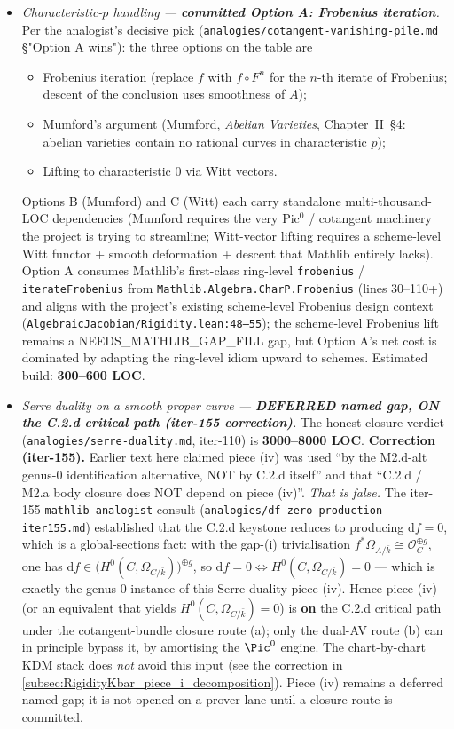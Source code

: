 \begin{itemize}
  \item[(iii)] \emph{Characteristic-\(p\) handling --- \textbf{committed Option A: Frobenius iteration}.} Per the analogist's decisive pick (\texttt{analogies/cotangent-vanishing-pile.md} \S "Option A wins"): the three options on the table are
  \begin{itemize}
    \item Frobenius iteration (replace \(f\) with \(f \circ F^n\) for the \(n\)-th iterate of Frobenius; descent of the conclusion uses smoothness of \(A\));
    \item Mumford's argument (Mumford, \emph{Abelian Varieties}, Chapter~II~\S4: abelian varieties contain no rational curves in characteristic \(p\));
    \item Lifting to characteristic \(0\) via Witt vectors.
  \end{itemize}
  Options B (Mumford) and C (Witt) each carry standalone multi-thousand-LOC dependencies (Mumford requires the very Pic\(^0\) / cotangent machinery the project is trying to streamline; Witt-vector lifting requires a scheme-level Witt functor + smooth deformation + descent that Mathlib entirely lacks). Option A consumes Mathlib's first-class ring-level \texttt{frobenius} / \texttt{iterateFrobenius} from \texttt{Mathlib.Algebra.CharP.Frobenius} (lines 30--110+) and aligns with the project's existing scheme-level Frobenius design context (\texttt{AlgebraicJacobian/Rigidity.lean:48--55}); the scheme-level Frobenius lift remains a NEEDS\_MATHLIB\_GAP\_FILL gap, but Option A's net cost is dominated by adapting the ring-level idiom upward to schemes. Estimated build: \textbf{300--600 LOC}.

  \item[(iv)] \emph{Serre duality on a smooth proper curve --- \textbf{DEFERRED named gap, ON the C.2.d critical path (iter-155 correction)}.} The honest-closure verdict (\texttt{analogies/serre-duality.md}, iter-110) is \textbf{3000--8000 LOC}. \textbf{Correction (iter-155).} Earlier text here claimed piece (iv) was used ``by the M2.d-alt genus-\(0\) identification alternative, NOT by C.2.d itself'' and that ``C.2.d / M2.a body closure does NOT depend on piece (iv)''. \emph{That is false.} The iter-155 \texttt{mathlib-analogist} consult (\texttt{analogies/df-zero-production-iter155.md}) established that the C.2.d keystone reduces to producing \(\mathrm df = 0\), which is a global-sections fact: with the gap-(i) trivialisation \(f^{*}\Omega_{A/\bar k} \cong \mathcal O_C^{\oplus g}\), one has \(\mathrm df \in \bigl(H^0(C, \Omega_{C/\bar k})\bigr)^{\oplus g}\), so \(\mathrm df = 0 \iff H^0(C, \Omega_{C/\bar k}) = 0\) --- which is exactly the genus-\(0\) instance of this Serre-duality piece (iv). Hence piece (iv) (or an equivalent that yields \(H^0(C, \Omega_{C/\bar k}) = 0\)) is \textbf{on} the C.2.d critical path under the cotangent-bundle closure route (a); only the dual-AV route (b) can in principle bypass it, by amortising the \(\Pic^0\) engine. The chart-by-chart KDM stack does \emph{not} avoid this input (see the correction in \cref{subsec:RigidityKbar_piece_i_decomposition}). Piece (iv) remains a deferred named gap; it is not opened on a prover lane until a closure route is committed.
\end{itemize}

